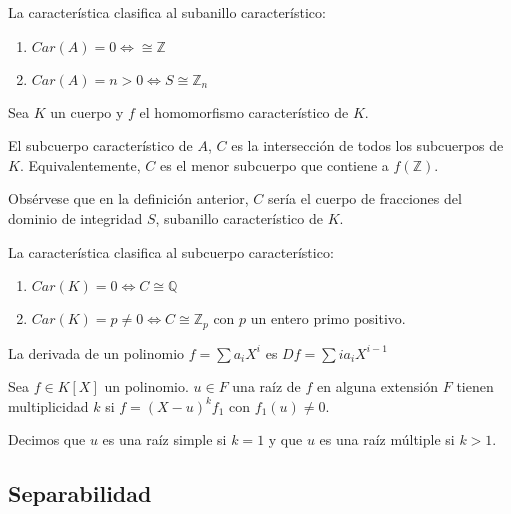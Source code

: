 \begin{proposition}
La característica clasifica al subanillo característico:

\begin{enumerate}
\item $Car(A) = 0 \iff \cong \mathbb{Z}$ 
\item $Car(A) = n > 0 \iff S \cong \mathbb{Z}_n$
\end{enumerate}
\end{proposition}

\begin{definition}
Sea $K$ un cuerpo y $f$ el homomorfismo característico de $K$. 

El subcuerpo característico de $A$, $C$ es la intersección de todos los subcuerpos de $K$. Equivalentemente, $C$ es el menor subcuerpo que contiene a $f(\mathbb{Z})$.
\end{definition}

Obsérvese que en la definición anterior, $C$ sería el cuerpo de fracciones del dominio de integridad $S$, subanillo característico de $K$. 

\begin{proposition}
La característica clasifica al subcuerpo característico:

\begin{enumerate}
\item $Car(K) = 0 \iff C \cong \mathbb{Q}$ 
\item $Car(K) = p \neq 0 \iff C \cong \mathbb{Z}_p$ con $p$ un entero primo positivo. 
\end{enumerate}
\end{proposition}

\begin{definition}
La derivada de un polinomio $f = \sum a_i X^i$ es $Df = \sum ia_iX^{i-1}$
\end{definition}

\begin{definition}
Sea $f \in K[X]$ un polinomio. $u \in F$ una raíz de $f$ en alguna extensión $F$ tienen multiplicidad $k$ si $f = (X-u)^kf_1$ con $f_1(u) \neq 0$. 

Decimos que $u$ es una raíz simple si $k = 1$ y que $u$ es una raíz múltiple si $k > 1$. 
\end{definition}

\subsection{Separabilidad}

